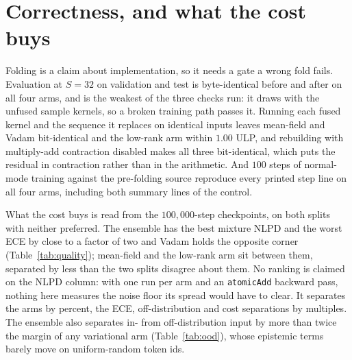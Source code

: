 \section{Correctness, and what the cost buys}
\label{sec:quality}


Folding is a claim about implementation, so it needs a gate a wrong fold fails.
Evaluation at $S = 32$ on validation and test is byte-identical before and after on all
four arms, and is the weakest of the three checks run: it draws with the unfused sample
kernels, so a broken training path passes it. Running each fused kernel and the
sequence it replaces on identical inputs leaves mean-field and Vadam bit-identical and
the low-rank arm within $1.00$ ULP, and rebuilding with multiply-add contraction
disabled makes all three bit-identical, which puts the residual in contraction rather
than in the arithmetic. And $100$ steps of
normal-mode training against the pre-folding source reproduce every printed step line
on all four arms, including both summary lines of the control.

What the cost buys is read from the $100{,}000$-step checkpoints, on both splits with
neither preferred. The ensemble has the best mixture NLPD and the worst ECE by close to
a factor of two and Vadam holds the opposite corner (Table~\ref{tab:quality});
mean-field and the low-rank arm sit between them, separated by less than the two splits
disagree about them. No ranking is claimed on the NLPD column: with one run per arm and
an \texttt{atomicAdd} backward pass, nothing here measures the noise floor its spread
would have to clear. It separates the arms by percent, the ECE, off-distribution and cost
separations by multiples. The ensemble also separates in- from off-distribution input by
more than twice the margin of any variational arm (Table~\ref{tab:ood}), whose
epistemic terms barely move on uniform-random token ids.

\begin{table}[t]
  \centering
  
  \caption{Predictive quality, in nats, over $16{,}384$ positions. ``Single draw'' is
  one posterior sample, or member $0$ for the ensemble: comparable within an arm, not
  across them.}
  \label{tab:quality}
\end{table}

\begin{table}[t]
  \centering
  
  \caption{In-distribution decomposition, in nats, by Equation~\ref{eq:decomp}. The
  worst residual against the asserted identity behind any number here is
  $4.4 \times 10^{-15}$.}
  \label{tab:uncertainty}
\end{table}

